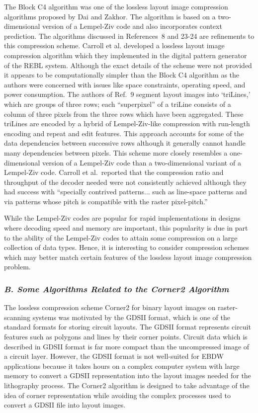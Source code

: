 \documentclass{article}
\begin{document}
The Block C4 algorithm was one of the lossless layout image compression
algorithms proposed by Dai and Zakhor.  The algorithm is based on a 
two-dimensional version of a Lempel-Ziv code and also incorporates context 
prediction.  The algorithms discussed in References~8 and 23-24 are
refinements to this compression scheme.
Carroll et al. developed a lossless layout image compression algorithm
which they implemented in the digital pattern generator of the REBL system.
Although the exact details of the scheme were not provided 
it appears to be computationally simpler than the Block C4 algorithm
as the authors were concerned with issues like
space constraints, operating speed, and power consumption.  
The authors of Ref.~9 segment layout images into `triLines,' which are groups
of three rows; each ``superpixel'' of a triLine consists of
a column of three pixels from the three rows which have been aggregated.
These triLines are encoded by a hybrid of Lempel-Ziv-like compression 
with run-length encoding and repeat and edit features.  
This approach accounts for
some of the data dependencies between successive rows although
it generally cannot handle many dependencies between 
pixels.  This scheme more closely resembles a one-dimensional version of a
Lempel-Ziv code than a two-dimensional variant of a Lempel-Ziv code.  
Carroll et al.~reported that the compression ratio and throughput of
the decoder needed were not consistently achieved although they had success
with ``specially contrived patterns... such as line-space patterns and via
patterns whose pitch is compatible with the raster pixel-pitch.'' 

While the Lempel-Ziv codes are popular for rapid implementations in designs 
where decoding speed and memory are important, this popularity is due in part
to the ability of the Lempel-Ziv codes to attain some compression on a large 
collection of data types.  Hence, it is interesting to consider 
compression schemes which may better match certain features of the lossless
layout image compression problem.

\subsubsection*{{\em B. Some Algorithms Related to the Corner2 Algorithm}}

The lossless compression scheme Corner2 
for binary layout images on  raster-scanning systems
was motivated by the GDSII format, which is one of the standard formats
for storing circuit layouts.  The GDSII format represents circuit features
such as polygons and lines by their corner points.
Circuit data which is described in GDSII format is far more compact than
the uncompressed image of a circuit layer. 
However, the GDSII format is not well-suited for EBDW applications because
it takes hours on a complex computer system with large memory to convert
a GDSII representation into the layout images needed for the lithography
process.  The Corner2 algorithm is designed to take advantage of the idea
of corner representation while avoiding the complex processes used to convert
a GDSII file into layout images. 
\end{document}
